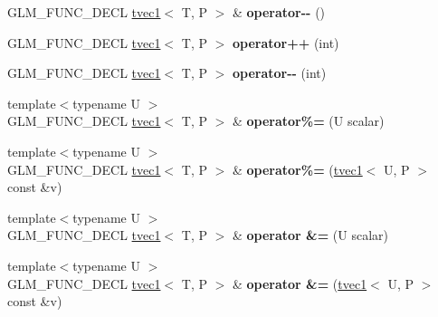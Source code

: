 \begin{DoxyCompactItemize}
\item 
\mbox{\label{structglm_1_1tvec1_ae2afe02d40b7a469d33543f16307611a}} 
G\+L\+M\+\_\+\+F\+U\+N\+C\+\_\+\+D\+E\+CL \hyperlink{structglm_1_1tvec1}{tvec1}$<$ T, P $>$ \& {\bfseries operator-\/-\/} ()
\item 
\mbox{\label{structglm_1_1tvec1_a4dbefeaefe398e52093be02b638047cd}} 
G\+L\+M\+\_\+\+F\+U\+N\+C\+\_\+\+D\+E\+CL \hyperlink{structglm_1_1tvec1}{tvec1}$<$ T, P $>$ {\bfseries operator++} (int)
\item 
\mbox{\label{structglm_1_1tvec1_af4251163c1a4e5a83e2c09e4dd685ecd}} 
G\+L\+M\+\_\+\+F\+U\+N\+C\+\_\+\+D\+E\+CL \hyperlink{structglm_1_1tvec1}{tvec1}$<$ T, P $>$ {\bfseries operator-\/-\/} (int)
\item 
\mbox{\label{structglm_1_1tvec1_a9b4ef4d29f77f31ce24043f0dbb185f4}} 
{\footnotesize template$<$typename U $>$ }\\G\+L\+M\+\_\+\+F\+U\+N\+C\+\_\+\+D\+E\+CL \hyperlink{structglm_1_1tvec1}{tvec1}$<$ T, P $>$ \& {\bfseries operator\%=} (U scalar)
\item 
\mbox{\label{structglm_1_1tvec1_acb4b8e73890ac7f9a0b4700c1c268500}} 
{\footnotesize template$<$typename U $>$ }\\G\+L\+M\+\_\+\+F\+U\+N\+C\+\_\+\+D\+E\+CL \hyperlink{structglm_1_1tvec1}{tvec1}$<$ T, P $>$ \& {\bfseries operator\%=} (\hyperlink{structglm_1_1tvec1}{tvec1}$<$ U, P $>$ const \&v)
\item 
\mbox{\label{structglm_1_1tvec1_a3ad68012a40c3d142b7fefb7b11b8f51}} 
{\footnotesize template$<$typename U $>$ }\\G\+L\+M\+\_\+\+F\+U\+N\+C\+\_\+\+D\+E\+CL \hyperlink{structglm_1_1tvec1}{tvec1}$<$ T, P $>$ \& {\bfseries operator \&=} (U scalar)
\item 
\mbox{\label{structglm_1_1tvec1_ae93dbeffb27aa69473d624c8420f1efa}} 
{\footnotesize template$<$typename U $>$ }\\G\+L\+M\+\_\+\+F\+U\+N\+C\+\_\+\+D\+E\+CL \hyperlink{structglm_1_1tvec1}{tvec1}$<$ T, P $>$ \& {\bfseries operator \&=} (\hyperlink{structglm_1_1tvec1}{tvec1}$<$ U, P $>$ const \&v)

\end{DoxyCompactItemize}
